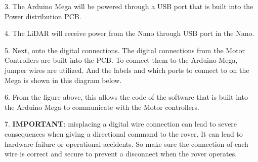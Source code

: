 \documentclass[a4paper, 10pt]{article}
\begin{document}
3. The Arduino Mega will be powered through a USB port that is built into the Power distribution PCB.

4. The LiDAR will receive power from the Nano through USB port in the Nano.

5. Next, onto the digital connections. The digital connections from the Motor Controllers are built into the PCB. To connect them to the Arduino Mega, jumper wires are utilized. And the labels and which ports to connect to on the Mega is shown in this diagram below.


6. From the figure above, this allows the code of the software that is built into the Arduino Mega to communicate with the Motor controllers.

7. \textbf{IMPORTANT}: misplacing a digital wire connection can lead to severe consequences when giving a directional command to the rover. It can lead to hardware failure or operational accidents. So make sure the connection of each wire is correct and secure to prevent a disconnect when the rover operates.
\end{document}
